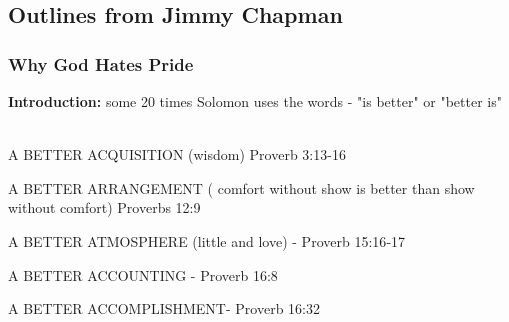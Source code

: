 \subsection{Outlines from Jimmy Chapman}


\subsubsection{Why God Hates Pride}


\noindent  \textbf{Introduction: } some 20 times Solomon uses the words - "is better" or "better is"  \\
\\

\begin{compactenum}[I.]
    \item A BETTER ACQUISITION (wisdom) Proverb 3:13-16
    \item  A BETTER ARRANGEMENT ( comfort without show  is better than show without comfort) Proverbs 12:9 
    \item  A BETTER ATMOSPHERE (little and love)  - Proverb 15:16‐17
    \item A BETTER ACCOUNTING -  Proverb 16:8
    \item A BETTER ACCOMPLISHMENT- Proverb 16:32
\end{compactenum} 





